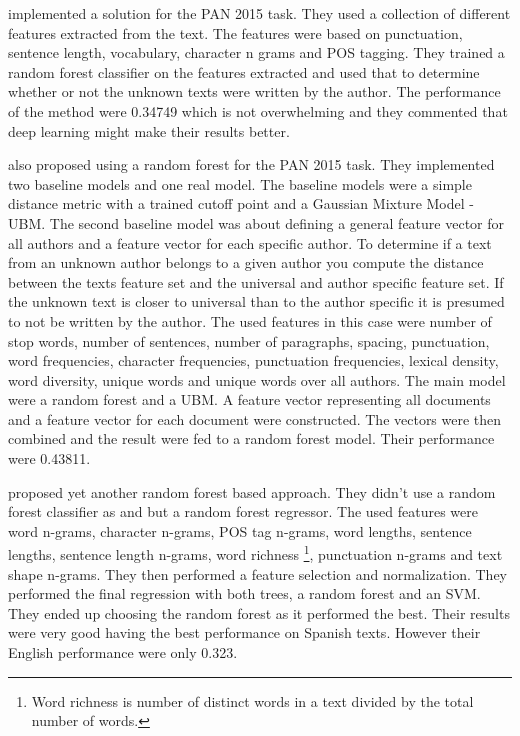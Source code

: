 \cite{maitra2015} implemented a solution for the PAN 2015 task. They used a
collection of different features extracted from the text. The features were
based on punctuation, sentence length, vocabulary, character n grams and
\gls{POS} tagging. They trained a random forest classifier on the features
extracted and used that to determine whether or not the unknown texts were
written by the author. The performance of the method were 0.34749 which is not
overwhelming and they commented that deep learning might make their results
better.

\cite{pacheco2015} also proposed using a random forest for the PAN 2015 task.
They implemented two baseline models and one real model. The baseline models
were a simple distance metric with a trained cutoff point and a Gaussian Mixture
Model - \gls{UBM}. The second baseline model was about defining a general
feature vector for all authors and a feature vector for each specific author. To
determine if a text from an unknown author belongs to a given author you compute
the distance between the texts feature set and the universal and author specific
feature set. If the unknown text is closer to universal than to the author
specific it is presumed to not be written by the author. The used features in
this case were number of stop words, number of sentences, number of paragraphs,
spacing, punctuation, word frequencies, character frequencies, punctuation
frequencies, lexical density, word diversity, unique words and unique words
over all authors. The main model were a random forest and a \gls{UBM}. A feature
vector representing all documents and a feature vector for each document were
constructed. The vectors were then combined and the result were fed to a random
forest model. Their performance were 0.43811.

\cite{bartoli2015b} proposed yet another random forest based approach.
They didn't use a random forest classifier as \cite{maitra2015} and
\cite{pacheco2015} but a random forest regressor. The used features were word
n-grams, character n-grams, \gls{POS} tag n-grams, word lengths, sentence
lengths, sentence length n-grams, word richness \footnote{Word richness is
number of distinct words in a text divided by the total number of words.},
punctuation n-grams and text shape n-grams. They then performed a feature
selection and normalization. They performed the final regression with both
trees, a random forest and an SVM. They ended up choosing the random forest as
it performed the best. Their results were very good having the best performance
on Spanish texts. However their English performance were only 0.323.


